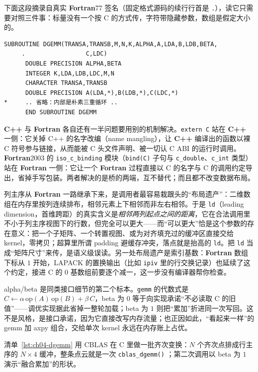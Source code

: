 \documentclass[12pt,a4paper,fontset=fandol]{ctexbook}
\newcommand{\Fn}[1]{\texttt{#1()}}
\newcommand{\Tp}[1]{\texttt{#1}}
\newcommand{\Bk}{\allowbreak}
\newcommand{\Lang}[1]{\textsf{\bfseries #1}}
\newcommand{\CPP}{\Lang{C++}}
\newcommand{\FTN}{\Lang{Fortran}}
\begin{document}
下面这段摘录自真实 \FTN{77} 签名（固定格式源码的续行行首是 \Tp{.}），读它只需要对照三件事：标量没有一个按 C 的方式传，字符带隐藏参数，数组是假定大小的。

\begin{lstlisting}[style=fortranstyle,caption={\FTN{77} 原文的 DGEMM 声明（摘录）：C 无法直接调用的三个原因},label={lst:ch04-fortran}]
      SUBROUTINE DGEMM(TRANSA,TRANSB,M,N,K,ALPHA,A,LDA,B,LDB,BETA,
     .                 C,LDC)
      DOUBLE PRECISION ALPHA,BETA
      INTEGER K,LDA,LDB,LDC,M,N
      CHARACTER TRANSA,TRANSB
      DOUBLE PRECISION A(LDA,*),B(LDB,*),C(LDC,*)
*     .. 省略：内部是朴素三重循环 ..
      END SUBROUTINE DGEMM
\end{lstlisting}

\CPP{} 与 \FTN{} 各自还有一半问题要用别的机制解决。\Tp{extern \textquotedbl C\textquotedbl} 站在 \CPP{} 一侧：它关掉 C++ 的名字改编（name mangling），让 \CPP{} 编译出的函数以裸 C 符号参与链接，从而能被 C 头文件声明、被一切认 C ABI 的运行时调用。\FTN{2003} 的 \Tp{iso\_c\_binding} 模块（\Tp{bind(C)} 子句与 \Tp{c\_double}、\Tp{c\_int} 类型）站在 \FTN{} 一侧：它让一个 \FTN{} 过程直接以 C 的名字与 C 的调用约定导出，省掉手写包装。两者解决的是桥的两端，互不替代；而且都不改变数据布局。

列主序从 \FTN{} 一路继承下来，是调用者最容易栽跟头的``布局遗产''：二维数组在内存里按列连续排布，相邻元素上下相邻而非左右相邻。于是 \Tp{ld}（leading dimension，首维跨距）的真实含义是\emph{相邻两列起点之间的距离}，它在合法调用里不小于列主序视图下的行数，但完全可以更大——而``可以更大''恰是这个参数的存在意义：把一个子矩阵、一个转置视图、或为对齐填充过的缓冲区直接交给 kernel，零拷贝；超算里所谓 padding 避缓存冲突，落点就是抬高的 \Tp{ld}。把 \Tp{ld} 当成``矩阵尺寸''来传，是语义级误读。另一处布局遗产是索引基数：\FTN{} 数组下标从 $1$ 开始，LAPACK 的置换输出（比如 \Tp{ipiv} 里的行交换记录）也延续了这个约定，接进 C 的 $0$ 基数组前要逐个减一，这一步没有编译器帮你检查。

alpha/beta 是同类接口细节的第二个标本。\Tp{gemm} 的代数式是 $C \leftarrow \alpha\,\mathrm{op}(A)\,\mathrm{op}(B) + \beta\,C$，beta 为 $0$ 等于向实现承诺``不必读取 C 的旧值''——调优实现据此省掉一整轮加载；beta 为 $1$ 则把``累加''折进同一次写回。这不是风格，是接口承诺，因为它直接改写内存流量；也正因如此，``看起来一样''的 gemm 加 axpy 组合，交给单次 kernel 永远在内存账上占优。

清单~\ref{lst:ch04-dgemm} 用 CBLAS 在 C 里做一批齐次变换：$N$ 个齐次点排成行主序的 $N \times 4$ 缓冲，整条点云就是一次 \Fn{cblas\_dgemm} \Bk{}；第二次调用以 beta 为 $1$ 演示``融合累加''的形状。
\end{document}
